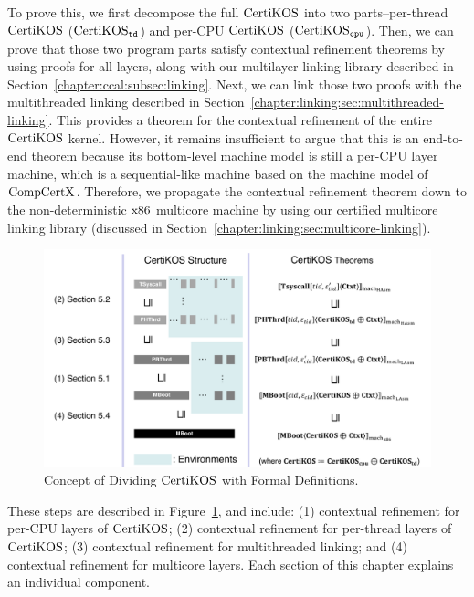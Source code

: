 To  prove this, we first decompose the full $\mathrm{CertiKOS}$ into two parts--per-thread $\mathrm{CertiKOS}$ ($\mathrm{CertiKOS}_{{\mathrm{\texttt{td}}}}$) and per-CPU $\mathrm{CertiKOS}$ ($\mathrm{CertiKOS}_{{\mathrm{\texttt{cpu}}}}$).
Then, we can prove that those two program parts satisfy contextual refinement theorems by using proofs for all layers,
along with our multilayer linking library described in Section~\ref{chapter:ccal:subsec:linking}. 
Next, we can link those two proofs with the multithreaded linking described in Section~\ref{chapter:linking:sec:multithreaded-linking}. 
This provides a theorem for the contextual refinement of the entire $\mathrm{CertiKOS}$ kernel. 
However, it remains insufficient to argue that this is an end-to-end theorem because its bottom-level machine model is still a per-CPU layer machine, which is a sequential-like machine based on the machine model of $\mathrm{CompCertX}$. 
Therefore, we propagate the contextual refinement theorem down to the non-deterministic $\mathrm{x86}$ multicore machine by using our certified multicore linking library (discussed in Section~\ref{chapter:linking:sec:multicore-linking}).
\begin{figure}
\includegraphics[width=\textwidth, page=1]{figs/certikos/concurrent_linking}
\caption{Concept of Dividing $\mathrm{CertiKOS}$ with Formal Definitions.} 
\label{fig:chapter:certikos:idea-of-dividing-certikos-with-formal-def}
\end{figure}
These steps are described in Figure~\ref{fig:chapter:certikos:idea-of-dividing-certikos-with-formal-def}, and include: 
(1) contextual refinement for per-CPU layers of $\mathrm{CertiKOS}$; 
(2) contextual refinement for per-thread layers of $\mathrm{CertiKOS}$; 
(3) contextual refinement for multithreaded linking; and 
(4) contextual refinement for multicore layers. Each section of this chapter explains an individual component.
